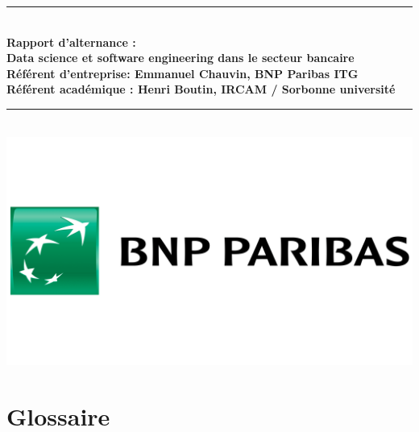 \documentclass[13pt,a4paper]{article}
\newcommand{\HRule}{\rule{\linewidth}{0.5mm}}
\begin{document}
  \begin{sffamily}
  \begin{center}
    \vspace{1cm}
   
    \HRule \\[0.4cm]
    { \huge \bfseries \bf \huge Rapport d'alternance :\\
    Data science et software engineering dans le secteur bancaire \\ 
    \normalsize \bf Référent d'entreprise: Emmanuel Chauvin, BNP Paribas ITG \\
    \bf Référent académique : Henri Boutin, IRCAM / Sorbonne université \\
 [0.4cm] }

    \HRule \\[2cm]
    \includegraphics[scale=0.2]{logo_bnp.png}
    \\[1cm]
    \vfill
  \end{center}
  \end{sffamily}
\newpage


\fancyhead[]{}

\tableofcontents 
\vspace{5cm}






\newpage
\section*{Glossaire}
\thispagestyle{empty}
\end{document}
